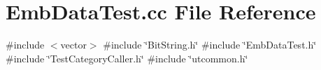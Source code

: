 \section{Emb\+Data\+Test.\+cc File Reference}
\label{EmbDataTest_8cc}
{\ttfamily \#include $<$vector$>$}\newline
{\ttfamily \#include \char`\"{}Bit\+String.\+h\char`\"{}}\newline
{\ttfamily \#include \char`\"{}Emb\+Data\+Test.\+h\char`\"{}}\newline
{\ttfamily \#include \char`\"{}Test\+Category\+Caller.\+h\char`\"{}}\newline
{\ttfamily \#include \char`\"{}utcommon.\+h\char`\"{}}\newline
